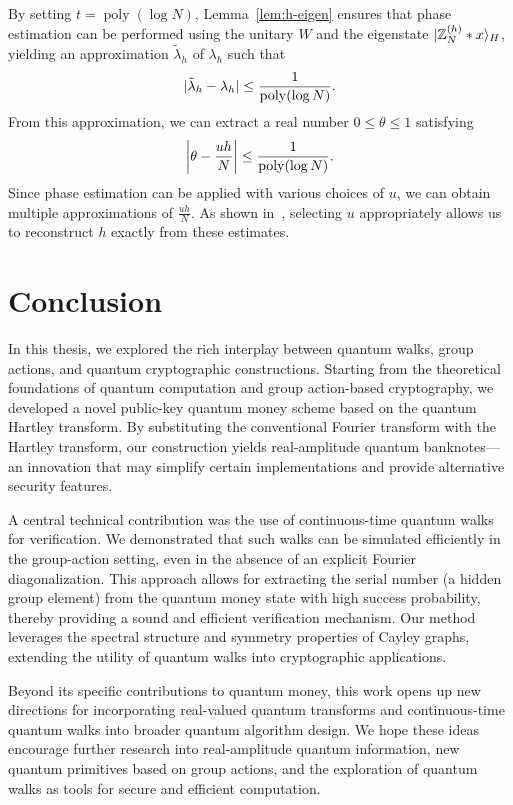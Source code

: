 \documentclass[12pt]{report}
\begin{document}
    By setting \( t = \operatorname{poly}(\log N) \), Lemma~\ref{lem:h-eigen} ensures that phase estimation can be performed using the unitary \( W \) and the eigenstate \( \ket{\mathbb{Z}_N^{(h)} * x}_H \), yielding an approximation \( \tilde{\lambda}_h \) of \( \lambda_h \) such that
    \[
    \abs{\tilde{\lambda}_h - \lambda_h} \le \frac{1}{\operatorname{poly}(\log N)}.
    \]
    From this approximation, we can extract a real number \( 0 \le \theta \le 1 \) satisfying
    \[
    \abs*{\theta - \frac{uh}{N}} \le \frac{1}{\operatorname{poly}(\log N)}.
    \]
    Since phase estimation can be applied with various choices of \( u \), we can obtain multiple approximations of \( \frac{uh}{N} \). As shown in~\cite{Zhandry2024}, selecting \( u \) appropriately allows us to reconstruct \( h \) exactly from these estimates.




    

\chapter*{Conclusion}

In this thesis, we explored the rich interplay between quantum walks, group actions, and quantum cryptographic constructions. Starting from the theoretical foundations of quantum computation and group action-based cryptography, we developed a novel public-key quantum money scheme based on the quantum Hartley transform. By substituting the conventional Fourier transform with the Hartley transform, our construction yields real-amplitude quantum banknotes—an innovation that may simplify certain implementations and provide alternative security features.

A central technical contribution was the use of continuous-time quantum walks for verification. We demonstrated that such walks can be simulated efficiently in the group-action setting, even in the absence of an explicit Fourier diagonalization. This approach allows for extracting the serial number (a hidden group element) from the quantum money state with high success probability, thereby providing a sound and efficient verification mechanism. Our method leverages the spectral structure and symmetry properties of Cayley graphs, extending the utility of quantum walks into cryptographic applications.

Beyond its specific contributions to quantum money, this work opens up new directions for incorporating real-valued quantum transforms and continuous-time quantum walks into broader quantum algorithm design. We hope these ideas encourage further research into real-amplitude quantum information, new quantum primitives based on group actions, and the exploration of quantum walks as tools for secure and efficient computation.








\end{document}
